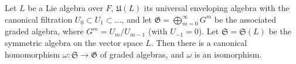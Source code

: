 Let $L$ be a Lie algebra over $F$, $\mathfrak{U}(L)$ its universal enveloping algebra with the canonical filtration $U_0 \subset U_1 \subset \dots$, and let $\mathfrak{G} = \bigoplus_{m=0}^{\infty} G^m$ be the associated graded algebra, where $G^m = U_m / U_{m-1}$ (with $U_{-1} = 0$). Let $\mathfrak{S} = \mathfrak{S}(L)$ be the symmetric algebra on the vector space $L$. Then there is a canonical homomorphism $\omega: \mathfrak{S} \to \mathfrak{G}$ of graded algebras, and $\omega$ is an isomorphism.

